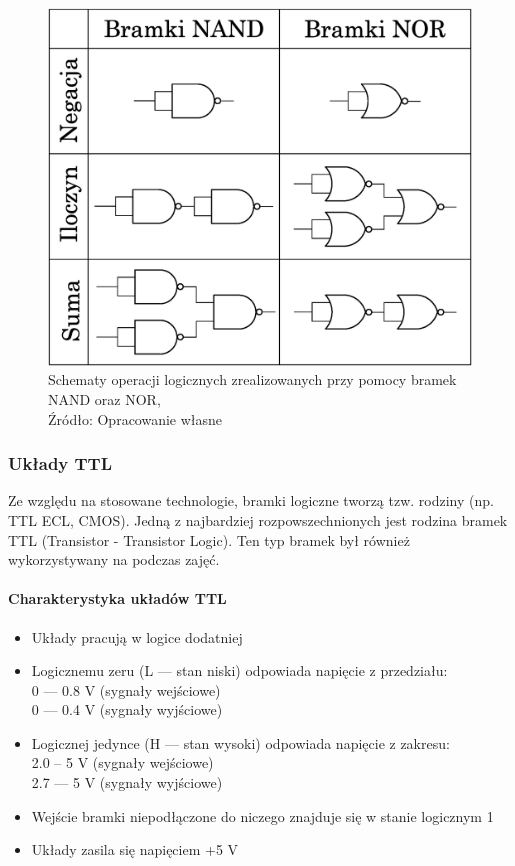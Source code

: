\documentclass{article}
\begin{document}
        \begin{figure}[!ht]
          \centering
          \includegraphics[scale=0.3]{grafiki/Operacje.eps}
          \caption{Schematy operacji logicznych zrealizowanych przy pomocy bramek NAND oraz NOR,
          \\Źródło: Opracowanie własne}
          \label{fig1:Operacje}
        \end{figure}
      
      \subsubsection{Układy TTL}
        Ze względu na stosowane technologie, bramki logiczne tworzą tzw. rodziny (np. TTL ECL, CMOS). Jedną z najbardziej rozpowszechnionych jest rodzina bramek TTL (Transistor - Transistor Logic). Ten typ bramek był również wykorzystywany na podczas zajęć.

        \paragraph{Charakterystyka układów TTL}
        \begin{itemize}
          \item Układy pracują w logice dodatniej
          \item Logicznemu zeru (L --- stan niski) odpowiada napięcie z przedziału: \\
          0 ---  0.8 V (sygnały wejściowe) \\
          0 --- 0.4 V (sygnały wyjściowe) \\
          \item Logicznej jedynce (H --- stan wysoki) odpowiada napięcie z zakresu: \\
         2.0 -- 5 V (sygnały wejściowe) \\
         2.7 --- 5 V (sygnały wyjściowe) \\
          \item Wejście bramki niepodłączone do niczego
          znajduje się w stanie logicznym 1
          \item Układy zasila się napięciem +5 V
        \end{itemize}
\end{document}
